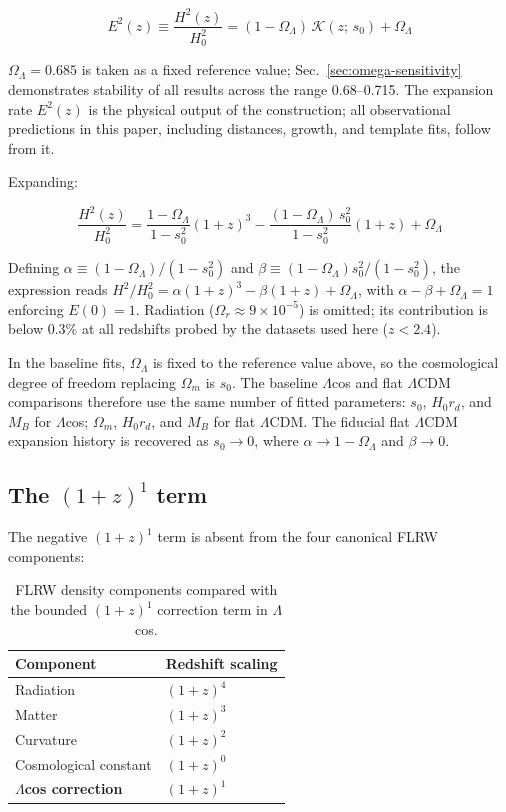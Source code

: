 \documentclass[
  aps,
  prd,
  onecolumn,         %
  nofootinbib,
  longbibliography
]{revtex4-2}
\begin{document}
\[E^2(z) \equiv \frac{H^2(z)}{H_0^2} = (1 - \Omega_\Lambda)\,\mathcal{K}(z;\,s_0) + \Omega_\Lambda\]

$\Omega_\Lambda = 0.685$ is taken as a fixed reference value; Sec.~\ref{sec:omega-sensitivity} demonstrates
stability of all results across the range 0.68--0.715.
The expansion rate $E^2(z)$ is the physical output of the construction;
all observational predictions in this paper, including distances, growth,
and template fits, follow from it.

Expanding:

\[\frac{H^2(z)}{H_0^2} = \frac{1 - \Omega_\Lambda}{1 - s_0^2}(1+z)^3 - \frac{(1 - \Omega_\Lambda)\,s_0^2}{1 - s_0^2}(1+z) + \Omega_\Lambda\]

Defining $\alpha \equiv (1-\Omega_\Lambda)/(1-s_0^2)$ and $\beta \equiv (1-\Omega_\Lambda)s_0^2/(1-s_0^2)$, the
expression reads $H^2/H_0^2 = \alpha(1+z)^3 - \beta(1+z) + \Omega_\Lambda$, with $\alpha - \beta + \Omega_\Lambda = 1$
enforcing $E(0) = 1$. Radiation ($\Omega_r \approx 9 \times 10^{-5}$) is omitted; its
contribution is below 0.3\% at all redshifts probed by the datasets used
here ($z < 2.4$).

In the baseline fits, $\Omega_\Lambda$ is fixed to the reference value above, so the
cosmological degree of freedom replacing $\Omega_m$ is $s_0$. The baseline $\Lambda$cos
and flat $\Lambda$CDM comparisons therefore use the same number of fitted
parameters: $s_0$, $H_0 r_d$, and $M_B$ for $\Lambda$cos; $\Omega_m$, $H_0 r_d$, and $M_B$ for
flat $\Lambda$CDM. The fiducial flat $\Lambda$CDM expansion history is recovered as $s_0 \to 0$, where $\alpha \to 1 - \Omega_\Lambda$ and $\beta \to 0$.

\subsection{The $(1+z)^1$ term}\label{sec:1z-term}

The negative $(1+z)^1$ term is absent from the four canonical FLRW
components:

\begin{table}[!ht]
\centering\footnotesize
\caption{FLRW density components compared with the bounded $(1{+}z)^1$ correction term in $\Lambda$cos.}\label{tab:flrw-components}
\begin{tabular}{@{}ll@{}}
\toprule
Component & Redshift scaling \\
\midrule

Radiation & $(1+z)^4$ \\
Matter & $(1+z)^3$ \\
Curvature & $(1+z)^2$ \\
Cosmological constant & $(1+z)^0$ \\
\textbf{$\Lambda$cos correction} & \textbf{$(1+z)^1$} \\
\bottomrule
\end{tabular}
\end{table}
\end{document}
